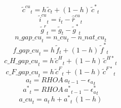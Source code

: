 \begin{dmath}
{{\tilde c^{cu}}}_{t}={{h}}\, {{\tilde c}}_{t}+\left(1-{{h}}\right)\, {{\tilde c^*}}_{t}
\end{dmath}
\begin{dmath}
{{\tilde i^{cu}}}_{t}={{i}}_{t}-{{\hat {\bar r}^{cu}}}_{t}
\end{dmath}
\begin{dmath}
{{\tilde g^{r}}}_{t}={{\tilde g}}_{t}-{{\tilde g^*}}_{t}
\end{dmath}
\begin{dmath}
{n\_gap\_cu}_{t}={n\_cu}_{t}-{n\_nat\_cu}_{t}
\end{dmath}
\begin{dmath}
{f\_gap\_cu}_{t}={{h}}\, {{\tilde f}}_{t}+\left(1-{{h}}\right)\, {{\tilde f^*}}_{t}
\end{dmath}
\begin{dmath}
{c\_H\_gap\_cu}_{t}={{h}}\, {{\tilde c^H}}_{t}+\left(1-{{h}}\right)\, {{\tilde c^{H*}}}_{t}
\end{dmath}
\begin{dmath}
{c\_F\_gap\_cu}_{t}={{h}}\, {{\tilde c^F}}_{t}+\left(1-{{h}}\right)\, {{\tilde c^{F*}}}_{t}
\end{dmath}
\begin{dmath}
{{a}}_{t}={RHOA}\, {{a}}_{t-1}-{{\epsilon_a}}_{t}
\end{dmath}
\begin{dmath}
{{a^*}}_{t}={RHOA}\, {{a^*}}_{t-1}-{{\epsilon_a^*}}_{t}
\end{dmath}
\begin{dmath}
{a\_cu}_{t}={{a}}_{t}\, {{h}}+{{a^*}}_{t}\, \left(1-{{h}}\right)
\end{dmath}
